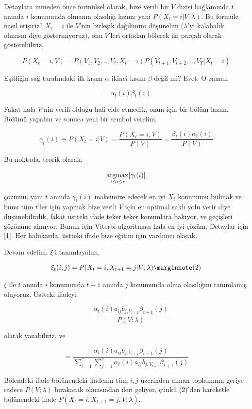 \documentclass[12pt,fleqn]{article}\usepackage{../../common}
\begin{document}
Detaylara inmeden önce formülsel olarak, bize verili bir $V$ dizisi
bağlamında $t$ anında $i$ konumunda olmanın olasılığı lazım; yani 
$P(X_t = i | V; \lambda)$. Bu formüle nasıl erişiriz? $X_t = i$ ile $V$'nin
birleşik dağılımını düşünelim ($\lambda$'yi kalabalık olmasın diye
göstermiyoruz), onu $V$'leri ortadan bölerek iki parçalı olarak 
gösterebiliriz,

$$ P(X_t = i, V) = P( V_1,V_2,..,V_t,X_t=i) P (V_{t+1},V_{t+2},..,V_T | X_t=i )
$$

Eşitliğin sağ tarafındaki ilk kısım $\alpha$ ikinci kısım $\beta$ değil mi?
Evet. O zaman 

$$  = \alpha_t(i) \beta_t(i) $$

Fakat hala $V$'nin verili olduğu hali elde etmedik, onun için bir bölüm
lazım. Bölümü yapalım ve sonuca yeni bir sembol verelim,

$$ 
\gamma_t(i) \equiv P(X_t = i | V) = 
\frac{P(X_t = i, V) }{P(V)} = 
\frac{\beta_t(i)\alpha_t(i)}{ P(V)} 
$$

Bu noktada, teorik olarak, 

$$ \mathop{\mathrm{argmax}}_{1 \le i \le c} [ \gamma_t(i) ] $$

çözümü, yani $t$ anında $\gamma_t(i)$ maksimize edecek en iyi $X_t$
konumunu bulmak ve bunu tüm $t$'ler için yapmak bize verili $V$ için en
optimal saklı yolu verir diye düşünebilirdik, fakat üstteki ifade teker
teker konumlara bakıyor, ve geçişleri gözönüne almıyor. Bunun için Viterbi
algoritması hala en iyi çözüm. Detaylar için [1]. Her halükarda, üstteki
ifade bize eğitim için yardımcı olacak. 

Devam edelim, $\xi$'i tanımlayalım,

$$ \xi_t(i,j) = P(X_t = i, X_{t+1}= j | V; \lambda) 
\mlabel{2}
$$

$\xi$ ile $t$ anında $i$ konumunda $t+1$ anında $j$ konumunda olma
olasılığını tanımlamış oluyoruz. Üstteki ifadeyi 

$$  = \frac{\alpha_t(i)a_{ij}b_{j,V_{t+1}}\beta_{t+1}(j)  }{P(V;\lambda)}$$

olarak yazabiliriz, ve

$$  
= \frac{\alpha_t(i)a_{ij}b_{j,V_{t+1}}\beta_{t+1}(j)  }
{\sum _{i=1}^{c}\sum _{j=1}^{c} \alpha_t(i)a_{ij}b_{j,V_{t+1}}\beta_{t+1}(j)  }
$$

Bölendeki ifade bölünendeki ifadenin tüm $i,j$ üzerinden alınan toplamının
geriye sadece $P(V;\lambda)$ bırakacak olmasından ileri geliyor, çünkü (2)'den
hareketle bölünendeki ifade $P(X_t = i, X_{t+1}= j, V; \lambda) $. 
\end{document}
